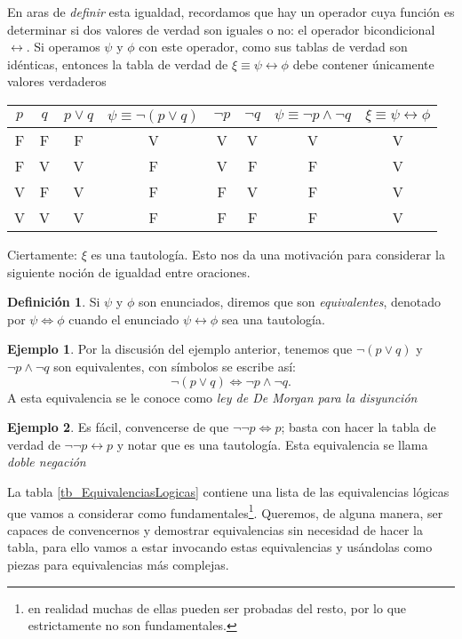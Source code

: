 \documentclass{book}
\theoremstyle{definition}
\newtheorem{df}{Definición}[chapter]
\newtheorem*{ejm}{Ejemplo}
\begin{document}
En aras de \emph{definir} esta igualdad,  recordamos que hay un operador cuya función es determinar si dos valores de verdad son iguales o no: el operador bicondicional $\leftrightarrow$.
Si operamos $\psi$ y $\phi$ con este operador, como sus tablas de verdad son idénticas, entonces la tabla de verdad de $\xi \equiv \psi \leftrightarrow \phi$ debe contener únicamente valores verdaderos %
\begin{center}\begin{tabular}{|c|c||c|c|c|c|c|c|}
		\hline
		$p$ & $q$ & $p\vee q$ & $\psi \equiv \neg (p \vee q)$ & $\neg p$ & $\neg q$ & $\psi \equiv \neg p \wedge \neg q$ & $\xi \equiv \psi \leftrightarrow \phi$ \\
		\hline\hline
		F & F & F & V & V & V & V & V \\ \hline
		F & V & V & F & V & F & F & V \\ \hline
		V & F & V & F & F & V & F & V \\ \hline
		V & V & V & F & F & F & F & V \\ \hline
\end{tabular}\end{center}

Ciertamente: $\xi$ es una tautología. Esto nos da una motivación para considerar la siguiente noción de igualdad entre oraciones.
\begin{df}\label{df_equivalenciaLogica}
	Si $\psi$ y $\phi$ son enunciados, diremos que son \emph{equivalentes}, denotado por $\psi \iff \phi$ cuando el enunciado $\psi \leftrightarrow \phi$ sea una tautología.
\end{df}

\begin{ejm}
	Por la discusión del ejemplo anterior, tenemos que $\neg (p \vee q)$ y $\neg p \wedge \neg q$ son equivalentes, con símbolos se escribe así: \[\neg (p \vee q) \iff \neg p \wedge \neg q.\]
	A esta equivalencia se le conoce como \emph{ley de De Morgan para la disyunción}
\end{ejm}

\begin{ejm}
	Es fácil, convencerse de que $\neg \neg p \iff p$; basta con hacer la tabla de verdad de $\neg \neg p \leftrightarrow p$ y notar que es una tautología. Esta equivalencia se llama \emph{doble negación}
\end{ejm}

La tabla \ref{tb_EquivalenciasLogicas} contiene una lista de las equivalencias lógicas que vamos a considerar como fundamentales\footnote{en realidad muchas de ellas pueden ser probadas del resto, por lo que estrictamente no son fundamentales.}.
Queremos, de alguna manera, ser capaces de convencernos y demostrar equivalencias sin necesidad de hacer la tabla, para ello vamos a estar invocando estas equivalencias y usándolas como piezas para equivalencias más complejas.
\end{document}
